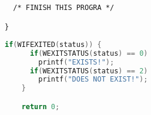 \documentclass{article}[9pt]
\newenvironment{answerfont}{\fontfamily{qhv}\selectfont}{\par}
\newenvironment{myanswer}{\begin{mdframed}\begin{answerfont}}{\end{answerfont}\end{mdframed}}
\begin{document}
\begin{enumerate}
\begin{verbatim}
  /* FINISH THIS PROGRA */

}
\end{verbatim}

  \begin{myanswer}
    \begin{lstlisting}[language=c]
    if(WIFEXITED(status)) {
      if(WEXITSTATUS(status) == 0)
        printf("EXISTS!");
      if(WEXITSTATUS(status) == 2)
        printf("DOES NOT EXIST!");
    }

    return 0;
    \end{lstlisting}
  \end{myanswer}

\end{enumerate}
\end{document}
